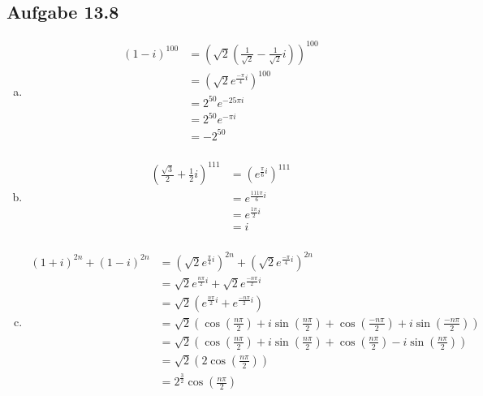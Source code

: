 \documentclass{standalone}
\begin{document}
\subsection{Aufgabe 13.8}
\begin{enumerate}[a)]
\item
    \begin{align*}
        (1-i)^{100} &= \left(\sqrt{2}\left(\frac{1}{\sqrt{2}}-\frac{1}{\sqrt{2}}i\right)\right)^{100} \\
                    &= \left(\sqrt{2}e^{\frac{-\pi}{4}i}\right)^{100} \\
                    &= 2^{50} e^{-25 \pi i} \\
                    &= 2^{50} e^{-\pi i} \\
                    &= -2^{50} \\
    \end{align*}

\item
    \begin{align*}
        (\frac{\sqrt{3}}{2}+\frac{1}{2}i)^{111} &= \left(e^{\frac{\pi}{6}i}\right)^{111} \\
                    &= e^{\frac{111\pi}{6}i} \\
                    &= e^{\frac{1\pi}{2}i} \\
                    &= i \\
    \end{align*}

\item
    \begin{align*}
        (1+i)^{2n}+(1-i)^{2n} &= \left(\sqrt{2}e^{\frac{\pi}{4}i}\right)^{2n} + \left(\sqrt{2}e^{\frac{-\pi}{4}i}\right)^{2n} \\
                              &= \sqrt{2}e^{\frac{n\pi}{2}i} + \sqrt{2}e^{\frac{-n\pi}{2}i} \\
                              &= \sqrt{2}\left(e^{\frac{n\pi}{2}i} + e^{\frac{-n\pi}{2}i}\right) \\
                              &= \sqrt{2}\left(\cos\left(\frac{n\pi}{2}\right) + i\sin\left(\frac{n\pi}{2}\right) + \cos\left(\frac{-n\pi}{2}\right) + i\sin\left(\frac{-n\pi}{2}\right)\right) \\
                              &= \sqrt{2}\left(\cos\left(\frac{n\pi}{2}\right) + i\sin\left(\frac{n\pi}{2}\right) + \cos\left(\frac{n\pi}{2}\right) - i\sin\left(\frac{n\pi}{2}\right)\right) \\
                              &= \sqrt{2}\left(2\cos\left(\frac{n\pi}{2}\right)\right) \\
                              &= 2^{\frac{3}{2}}\cos\left(\frac{n\pi}{2}\right) \\
    \end{align*}

\end{enumerate}
\end{document}
